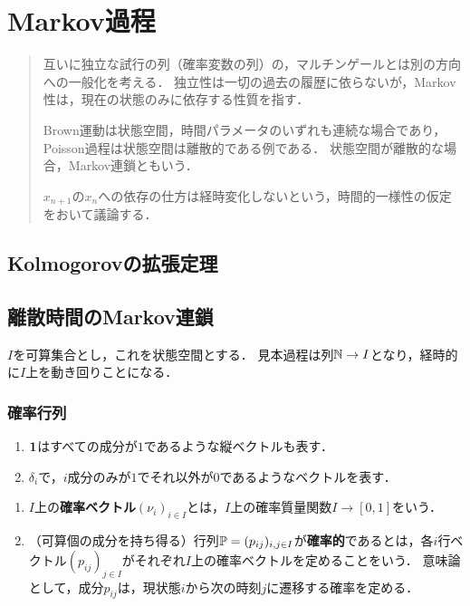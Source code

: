 \documentclass[uplatex,dvipdfmx]{jsreport}
\begin{document}
\chapter{Markov過程}

\begin{quote}
    互いに独立な試行の列（確率変数の列）の，マルチンゲールとは別の方向への一般化を考える．
    独立性は一切の過去の履歴に依らないが，Markov性は，現在の状態のみに依存する性質を指す．

    Brown運動は状態空間，時間パラメータのいずれも連続な場合であり，Poisson過程は状態空間は離散的である例である．
    状態空間が離散的な場合，Markov連鎖ともいう．

    $x_{n+1}$の$x_n$への依存の仕方は経時変化しないという，時間的一様性の仮定をおいて議論する．
\end{quote}

\section{Kolmogorovの拡張定理}

\section{離散時間のMarkov連鎖}

\begin{notation}
    $I$を可算集合とし，これを状態空間とする．
    見本過程は列$\mathbb{N}\to I$となり，経時的に$I$上を動き回りことになる．
\end{notation}

\subsection{確率行列}

\begin{notation}\mbox{}
    \begin{enumerate}
        \item $\mathbf{1}$はすべての成分が$1$であるような縦ベクトルも表す．
        \item $\delta_i$で，$i$成分のみが$1$でそれ以外が$0$であるようなベクトルを表す．
    \end{enumerate}
\end{notation}

\begin{definition}\mbox{}
    \begin{enumerate}
        \item $I$上の\textbf{確率ベクトル}$(\nu_i)_{i\in I}$とは，$I$上の確率質量関数$I\to[0,1]$をいう．
        \item （可算個の成分を持ち得る）行列$\mathbb{P}=(p_{ij})_{i,j\in I}$が\textbf{確率的}であるとは，各$i$行ベクトル$(p_{ij})_{j\in I}$がそれぞれ$I$上の確率ベクトルを定めることをいう．
        意味論として，成分$p_{ij}$は，現状態$i$から次の時刻$j$に遷移する確率を定める．
    \end{enumerate}
\end{definition}
\end{document}
